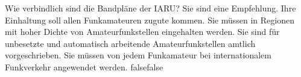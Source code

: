     {Wie verbindlich sind die Bandpläne der IARU?}
    {Sie sind eine Empfehlung. Ihre Einhaltung soll allen Funkamateuren zugute kommen.}
    {Sie müssen in Regionen mit hoher Dichte von Amateurfunkstellen eingehalten werden.}
    {Sie sind für unbesetzte und automatisch arbeitende Amateurfunkstellen amtlich vorgeschrieben.}
    {Sie müssen von jedem Funkamateur bei internationalem Funkverkehr angewendet werden.}
    {false}{false}